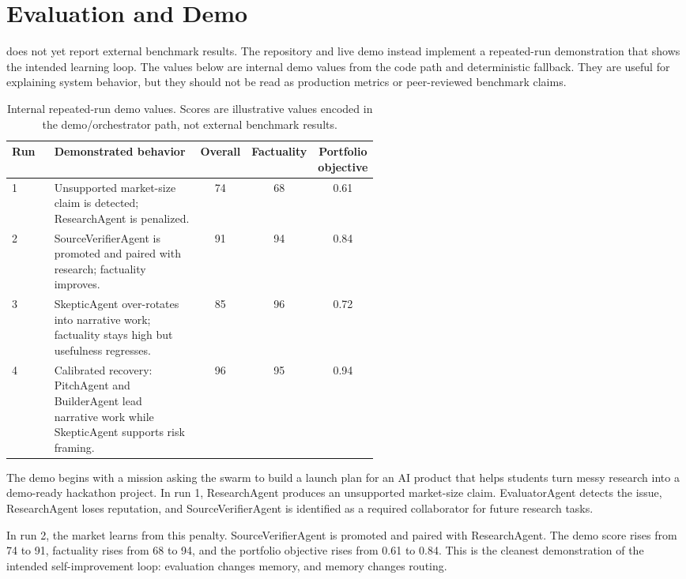 \section{Evaluation and Demo}

\systemname{} does not yet report external benchmark results. The repository and live demo instead implement a repeated-run demonstration that shows the intended learning loop. The values below are internal demo values from the code path and deterministic fallback. They are useful for explaining system behavior, but they should not be read as production metrics or peer-reviewed benchmark claims.

\begin{table}[t]
\centering
\caption{Internal repeated-run demo values. Scores are illustrative values encoded in the demo/orchestrator path, not external benchmark results.}
\label{tab:demo-runs}
\begin{tabular}{p{0.12\linewidth}p{0.42\linewidth}ccc}
\toprule
Run & Demonstrated behavior & Overall & Factuality & Portfolio objective \\
\midrule
1 & Unsupported market-size claim is detected; ResearchAgent is penalized. & 74 & 68 & 0.61 \\
2 & SourceVerifierAgent is promoted and paired with research; factuality improves. & 91 & 94 & 0.84 \\
3 & SkepticAgent over-rotates into narrative work; factuality stays high but usefulness regresses. & 85 & 96 & 0.72 \\
4 & Calibrated recovery: PitchAgent and BuilderAgent lead narrative work while SkepticAgent supports risk framing. & 96 & 95 & 0.94 \\
\bottomrule
\end{tabular}
\end{table}

The demo begins with a mission asking the swarm to build a launch plan for an AI product that helps students turn messy research into a demo-ready hackathon project. In run 1, ResearchAgent produces an unsupported market-size claim. EvaluatorAgent detects the issue, ResearchAgent loses reputation, and SourceVerifierAgent is identified as a required collaborator for future research tasks.

In run 2, the market learns from this penalty. SourceVerifierAgent is promoted and paired with ResearchAgent. The demo score rises from 74 to 91, factuality rises from 68 to 94, and the portfolio objective rises from 0.61 to 0.84. This is the cleanest demonstration of the intended self-improvement loop: evaluation changes memory, and memory changes routing.

